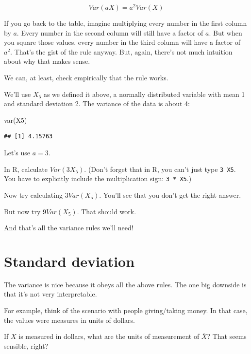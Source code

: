 \documentclass[
]{book}
\newenvironment{Shaded}{\begin{snugshade}}{\end{snugshade}}
\newcommand{\FunctionTok}[1]{\textcolor[rgb]{0.00,0.00,0.00}{#1}}
\newcommand{\NormalTok}[1]{#1}
\begin{document}
\[
Var\left(aX\right) = a^2 Var\left(X\right)
\]

If you go back to the table, imagine multiplying every number in the first column by \(a\). Every number in the second column will still have a factor of \(a\). But when you square those values, every number in the third column will have a factor of \(a^{2}\). That's the gist of the rule anyway. But, again, there's not much intuition about why that makes sense.

We can, at least, check empirically that the rule works.

We'll use \(X_{5}\) as we defined it above, a normally distributed variable with mean 1 and standard deviation 2. The variance of the data is about 4:

\begin{Shaded}
\begin{Highlighting}[]
\FunctionTok{var}\NormalTok{(X5)}
\end{Highlighting}
\end{Shaded}

\begin{verbatim}
## [1] 4.15763
\end{verbatim}

Let's use \(a = 3\).

In R, calculate \(Var\left(3X_{5}\right)\). (Don't forget that in R, you can't just type \texttt{3\ X5}. You have to explicitly include the multiplication sign: \texttt{3\ *\ X5}.)

Now try calculating \(3 Var\left(X_{5}\right)\). You'll see that you don't get the right answer.

But now try \(9 Var\left(X_{5}\right)\). That should work.

And that's all the variance rules we'll need!

\hypertarget{variance-sd}{%
\section{Standard deviation}\label{variance-sd}}

The variance is nice because it obeys all the above rules. The one big downside is that it's not very interpretable.

For example, think of the scenario with people giving/taking money. In that case, the values were measures in units of dollars.

If \(X\) is measured in dollars, what are the units of measurement of \(\overline{X}\)? That seems sensible, right?
\end{document}
